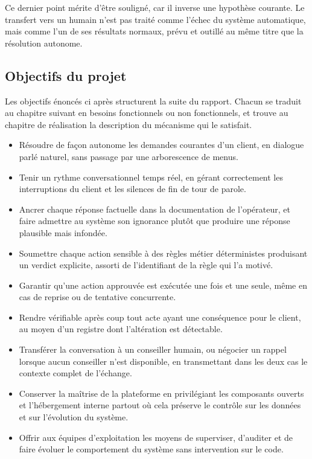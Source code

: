 Ce dernier point mérite d'être souligné, car il inverse une hypothèse courante. Le transfert vers un humain n'est pas traité comme l'échec du système automatique, mais comme l'un de ses résultats normaux, prévu et outillé au même titre que la résolution autonome.

\subsection{Objectifs du projet}

Les objectifs énoncés ci après structurent la suite du rapport. Chacun se traduit au chapitre suivant en besoins fonctionnels ou non fonctionnels, et trouve au chapitre de réalisation la description du mécanisme qui le satisfait.

\begin{itemize}
  \item Résoudre de façon autonome les demandes courantes d'un client, en dialogue parlé naturel, sans passage par une arborescence de menus.
  \item Tenir un rythme conversationnel temps réel, en gérant correctement les interruptions du client et les silences de fin de tour de parole.
  \item Ancrer chaque réponse factuelle dans la documentation de l'opérateur, et faire admettre au système son ignorance plutôt que produire une réponse plausible mais infondée.
  \item Soumettre chaque action sensible à des règles métier déterministes produisant un verdict explicite, assorti de l'identifiant de la règle qui l'a motivé.
  \item Garantir qu'une action approuvée est exécutée une fois et une seule, même en cas de reprise ou de tentative concurrente.
  \item Rendre vérifiable après coup tout acte ayant une conséquence pour le client, au moyen d'un registre dont l'altération est détectable.
  \item Transférer la conversation à un conseiller humain, ou négocier un rappel lorsque aucun conseiller n'est disponible, en transmettant dans les deux cas le contexte complet de l'échange.
  \item Conserver la maîtrise de la plateforme en privilégiant les composants ouverts et l'hébergement interne partout où cela préserve le contrôle sur les données et sur l'évolution du système.
  \item Offrir aux équipes d'exploitation les moyens de superviser, d'auditer et de faire évoluer le comportement du système sans intervention sur le code.
\end{itemize}

